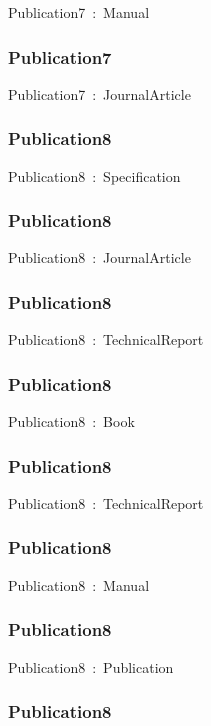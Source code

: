 \documentclass{article}
\begin{document}
Publication7~:~Manual

\subsubsection*{Publication7}

Publication7~:~JournalArticle

\subsubsection*{Publication8}

Publication8~:~Specification

\subsubsection*{Publication8}

Publication8~:~JournalArticle

\subsubsection*{Publication8}

Publication8~:~TechnicalReport

\subsubsection*{Publication8}

Publication8~:~Book

\subsubsection*{Publication8}

Publication8~:~TechnicalReport

\subsubsection*{Publication8}

Publication8~:~Manual

\subsubsection*{Publication8}

Publication8~:~Publication

\subsubsection*{Publication8}
\end{document}
